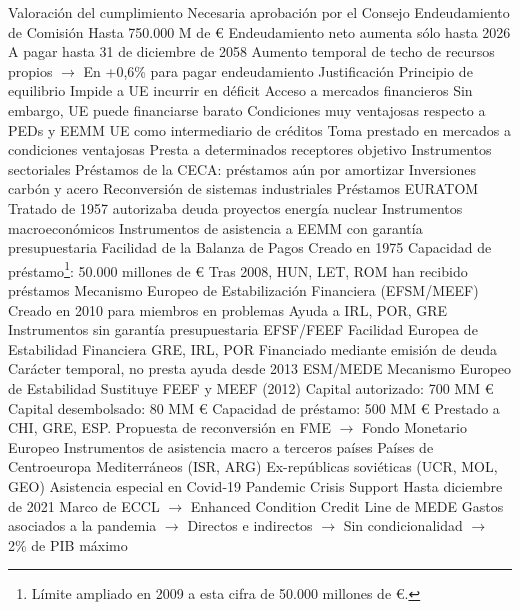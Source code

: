 \documentclass{nuevotema}
\begin{document}
\begin{esquemal}
				\4[] Valoración del cumplimiento
				\4[] Necesaria aprobación por el Consejo
				\4 Endeudamiento de Comisión
				\4[] Hasta 750.000 M de €
				\4[] Endeudamiento neto aumenta sólo hasta 2026
				\4[] A pagar hasta 31 de diciembre de 2058
				\4[] Aumento temporal de techo de recursos propios
				\4[] $\to$ En +0,6\% para pagar endeudamiento
	\1 
		\2 Justificación
			\3 Principio de equilibrio
				\4 Impide a UE incurrir en déficit
			\3 Acceso a mercados financieros
				\4 Sin embargo, UE puede financiarse barato
				\4[] Condiciones muy ventajosas respecto a PEDs y EEMM
			\3 UE como intermediario de créditos
				\4 Toma prestado en mercados a condiciones ventajosas
				\4 Presta a determinados receptores objetivo
		\2 Instrumentos sectoriales
			\3 Préstamos de la CECA: préstamos aún por amortizar
				\4 Inversiones carbón y acero
				\4 Reconversión de sistemas industriales
			\3 Préstamos EURATOM
				\4 Tratado de 1957 autorizaba deuda proyectos energía nuclear
		\2 Instrumentos macroeconómicos
			\3 Instrumentos de asistencia a EEMM con garantía presupuestaria
				\4 Facilidad de la Balanza de Pagos
				\4[] Creado en 1975
				\4[] Capacidad de préstamo\footnote{Límite ampliado en 2009 a esta cifra de 50.000 millones de €.}: 50.000 millones de €
				\4[] Tras 2008, HUN, LET, ROM han recibido préstamos
				\4 Mecanismo Europeo de Estabilización Financiera (EFSM/MEEF)
				\4[] Creado en 2010 para miembros en problemas
				\4[] Ayuda a IRL, POR, GRE
			\3 Instrumentos sin garantía presupuestaria
				\4 EFSF/FEEF
				\4[] Facilidad Europea de Estabilidad Financiera
				\4[] GRE, IRL, POR
				\4[] Financiado mediante emisión de deuda
				\4[] Carácter temporal, no presta ayuda desde 2013
				\4 ESM/MEDE
				\4[] Mecanismo Europeo de Estabilidad
				\4[] Sustituye FEEF y MEEF (2012)
				\4[] Capital autorizado: 700 MM €
				\4[] Capital desembolsado: 80 MM €
				\4[] Capacidad de préstamo: 500 MM €
				\4[] Prestado a CHI, GRE, ESP.
				\4[] Propuesta de reconversión en FME
				\4[] $\to$ Fondo Monetario Europeo
			\3 Instrumentos de asistencia macro a terceros países
				\4 Países de Centroeuropa
				\4 Mediterráneos (ISR, ARG)
				\4 Ex-repúblicas soviéticas (UCR, MOL, GEO)
			\3 Asistencia especial en Covid-19
				\4 Pandemic Crisis Support
				\4[] Hasta diciembre de 2021
				\4[] Marco de ECCL
				\4[] $\to$ Enhanced Condition Credit Line de MEDE
				\4[] Gastos asociados a la pandemia
				\4[] $\to$ Directos e indirectos
				\4[] $\to$ Sin condicionalidad
				\4[] $\to$ 2\% de PIB máximo

\end{esquemal}
\end{document}
